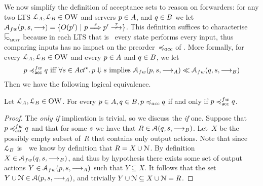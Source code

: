 
We now simplify the definition of acceptance sets to reason on
forwarders: %
for any two LTS $\mathcal{L}_A, \mathcal{L}_B \in \textsc{OW}$ and servers
$ p \in A$, and $q \in B$  we let
$\accfwp{ \state }{ \trace }{ \st{} } =  \setof{ O(\state') }{ \state
  \wt{ \trace } \state' \stable }$.
This definition suffices to characterise~$\testleqS$ because in each LTS that is \obaFW\ every state performs
every input, thus comparing inputs has no impact on the
preorder~$\bhvleqtwo$ of . More formally,
for every $\mathcal{L}_A, \mathcal{L}_B \in \textsc{OW}$ and every $p \in A$ and $q \in B$,
we let %
$$
\serverA \asleqAfw \serverB \text{ iff } \forall \trace \in \Actfin \wehavethat \serverA \cnvalong \trace \implies \accfwp{ \serverA }{ \trace }{ \st{}_\StatesA } \ll \accfwp{ \serverB }{ \trace }{ \st{}_\StatesB }
$$
Then we have the following logical equivalence.
\begin{lemma}
  \label{lem:conditions-on-accsets-logically-equivalent}
  Let $\mathcal{L}_A, \mathcal{L}_B \in \textsc{OW}$.
  For every $\serverA \in \StatesA, \serverB \in \StatesB, \serverA \bhvleqtwo \serverB$
  if and only if $\serverA \asleqAfw \serverB$.
\end{lemma}
\begin{proof}
  The {\em only if} implication is trivial, so we discuss the {\em if}
  one. Suppose that $ \serverA \asleqAfw \serverB  $ and that for some
  $s$ we have that $R \in \mathcal{A}(q,s,\mathrel{\overset{}\longrightarrow}_B)$. Let~$X$ be
  the possibly empty subset of~$R$ that contains only output actions.
  Note that since~$\mathcal{L}_B$ is~\obaFW\ we know by definition that $R =
  X \cup \mathcal{N}$.
  By definition $X \in \accfwp{\serverB}{s}{\st{}_B}$, and thus by
  hypothesis there exists some set of output actions $Y \in
  \accfwp{\serverA}{s}{\st{}_A}$ such that $Y \subseteq X$.
  It follows that the set $Y \cup \mathcal{N} \in
  \mathcal{A}(p,s,\mathrel{\overset{}\longrightarrow}_A)$, and trivially $Y \cup \mathcal{N} \subseteq
  X \cup \mathcal{N} = R$.
\end{proof}





